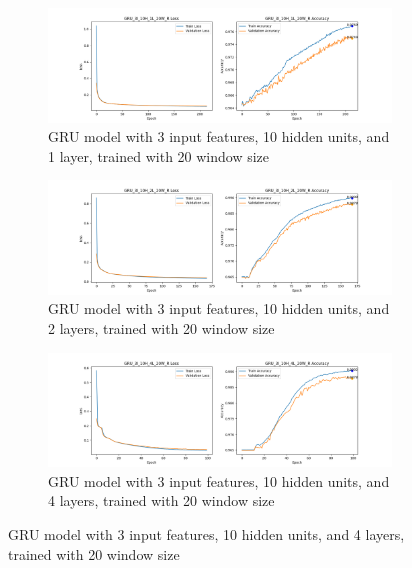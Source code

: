 \documentclass{article}
\begin{document}
    \begin{figure}[ht]
        \centering
        \begin{subfigure}
            {\textwidth}
            \centering
            \includegraphics[width=\textwidth]{GRU_3I_10H_1L_20W_R_GRAPH.png}
            \caption{GRU model with 3 input features, 10 hidden units, and 1
            layer, trained with 20 window size}
            \label{fig:GRU_3I_10H_1L_20W_R_GRAPH}
        \end{subfigure}
        \begin{subfigure}
            {\textwidth}
            \centering
            \includegraphics[width=\textwidth]{GRU_3I_10H_2L_20W_R_GRAPH.png}
            \caption{GRU model with 3 input features, 10 hidden units, and 2
            layers, trained with 20 window size}
            \label{fig:GRU_3I_10H_2L_20W_R_GRAPH}
        \end{subfigure}
        \begin{subfigure}
            {\textwidth}
            \centering
            \includegraphics[width=\textwidth]{GRU_3I_10H_4L_20W_R_GRAPH.png}
            \caption{GRU model with 3 input features, 10 hidden units, and 4
            layers, trained with 20 window size}

\end{subfigure}
\end{figure}
\end{document}

